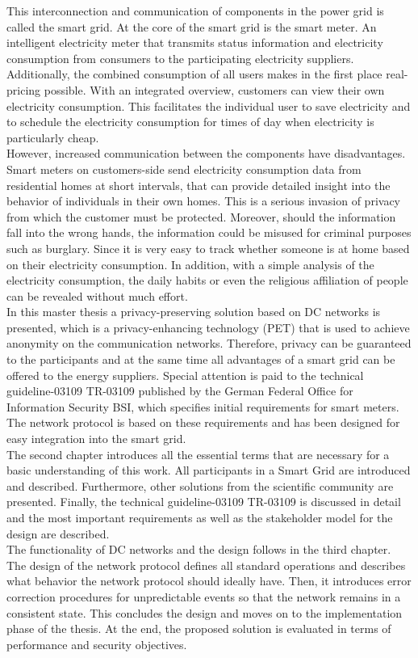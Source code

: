 This interconnection and communication of components in the power grid is called the smart grid. At the core of the smart grid is the smart meter. An intelligent electricity meter that transmits status information and electricity consumption from consumers to the participating electricity suppliers. Additionally, the combined consumption of all users makes in the first place real-pricing possible. With an integrated overview, customers can view their own electricity consumption. This facilitates the individual user to save electricity and to schedule the electricity consumption for times of day when electricity is particularly cheap.\\ However, increased communication between the components have disadvantages. Smart meters on customers-side send electricity consumption data from residential homes at short intervals, that can provide detailed insight into the behavior of individuals in their own homes. This is a serious invasion of privacy from which the customer must be protected. Moreover, should the information fall into the wrong hands, the information could be misused for criminal purposes such as burglary. Since it is very easy to track whether someone is at home based on their electricity consumption. In addition, with a simple analysis of the electricity consumption, the daily habits or even the religious affiliation of people can be revealed without much effort.\\ In this master thesis a privacy-preserving solution based on DC networks is presented, which is a privacy-enhancing technology (PET) that is used to achieve anonymity on the communication networks. Therefore, privacy can be guaranteed to the participants and at the same time all advantages of a smart grid can be offered to the energy suppliers. Special attention is paid to the technical guideline-03109 \gls{TR-03109} published by the German Federal Office for Information Security \gls{BSI}, which specifies initial requirements for smart meters. The network protocol is based on these requirements and has been designed for easy integration into the smart grid.\\ The second chapter introduces all the essential terms that are necessary for a basic understanding of this work. All participants in a Smart Grid are introduced and described. Furthermore, other solutions from the scientific community are presented. Finally, the technical guideline-03109 \gls{TR-03109} is discussed in detail and the most important requirements as well as the stakeholder model for the design are described.\\ The functionality of DC networks and the design follows in the third chapter. The design of the network protocol defines all standard operations and describes what behavior the network protocol should ideally have. Then, it introduces error correction procedures for unpredictable events so that the network remains in a consistent state. This concludes the design and moves on to the implementation phase of the thesis. At the end, the proposed solution is evaluated in terms of performance and security objectives.\\
